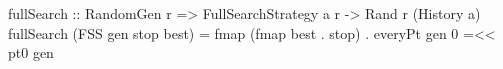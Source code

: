 fullSearch :: RandomGen r => FullSearchStrategy a r -> Rand r (History a)
fullSearch (FSS gen stop best) = fmap (fmap best . stop) . everyPt gen 0 =<< pt0 gen
